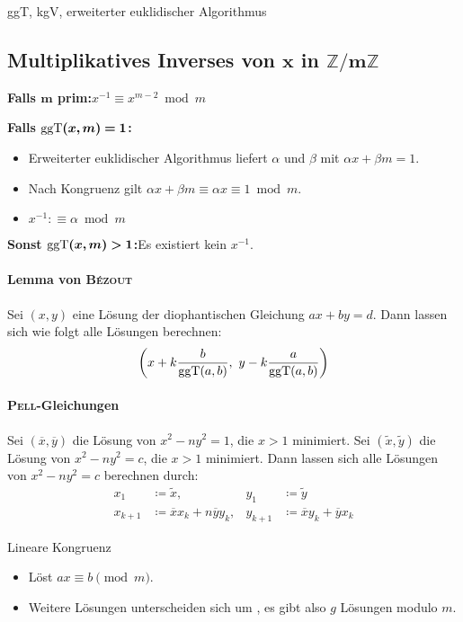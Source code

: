 \begin{algorithm}{ggT, kgV, erweiterter euklidischer Algorithmus}
\end{algorithm}

\subsection{Multiplikatives Inverses von $\boldsymbol{x}$ in $\boldsymbol{\mathbb{Z}/m\mathbb{Z}}$}
\textbf{Falls $\boldsymbol{m}$ prim:}\quad $x^{-1} \equiv x^{m-2} \bmod m$

\textbf{Falls $\boldsymbol{\text{ggT}(x, m) = 1}$:}
\begin{itemize}
	\item Erweiterter euklidischer Algorithmus liefert $\alpha$ und $\beta$ mit
	$\alpha x + \beta m = 1$.
	\item Nach Kongruenz gilt $\alpha x + \beta m \equiv \alpha x \equiv 1 \bmod m$.
	\item $x^{-1} :\equiv \alpha \bmod m$
\end{itemize}
\textbf{Sonst $\boldsymbol{\text{ggT}(x, m) > 1}$:}\quad Es existiert kein $x^{-1}$.

\paragraph{Lemma von \textsc{Bézout}}
Sei $(x, y)$ eine Lösung der diophantischen Gleichung $ax + by = d$.
Dann lassen sich wie folgt alle Lösungen berechnen:
\[
\left(x + k\frac{b}{\text{ggT}(a, b)},~y - k\frac{a}{\text{ggT}(a, b)}\right)
\]

\paragraph{\textsc{Pell}-Gleichungen}
Sei $(\overline{x}, \overline{y})$ die Lösung von $x^2 - ny^2 = 1$, die $x>1$ minimiert.
Sei $(\tilde{x}, \tilde{y})$ die Lösung von $x^2-ny^2 = c$, die $x>1$ minimiert. Dann lassen
sich alle Lösungen von $x^2-ny^2=c$ berechnen durch:
\begin{align*}
	x_1&\coloneqq \tilde{x}, & y_1&\coloneqq\tilde{y}\\
	x_{k+1}&\coloneqq \overline{x}x_k+n\overline{y}y_k, & y_{k+1}&\coloneqq\overline{x}y_k+\overline{y}x_k
\end{align*}

\begin{algorithm}{Lineare Kongruenz}
	\begin{itemize}
		\item Löst $ax\equiv b\pmod{m}$.
		\item Weitere Lösungen unterscheiden sich um , es gibt
		also $g$ Lösungen modulo $m$.
	\end{itemize}
\end{algorithm}

